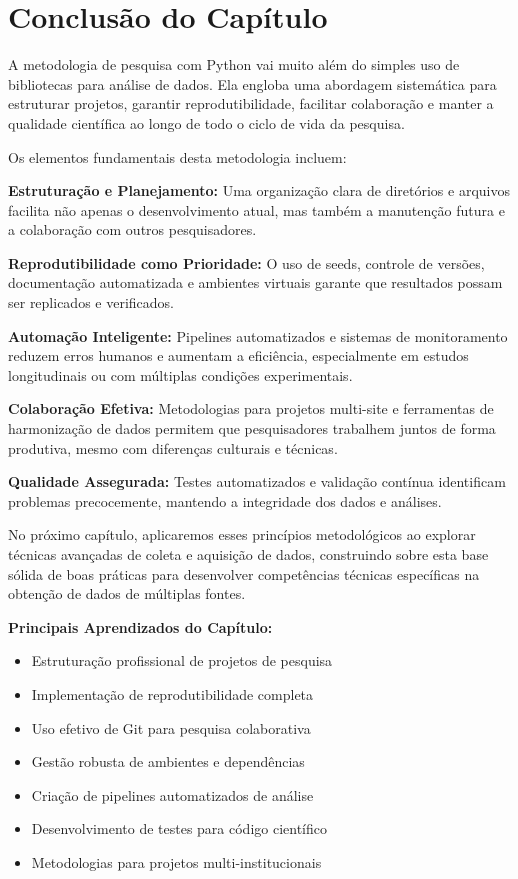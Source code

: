 \section{Conclusão do Capítulo}

A metodologia de pesquisa com Python vai muito além do simples uso de bibliotecas para análise de dados. Ela engloba uma abordagem sistemática para estruturar projetos, garantir reprodutibilidade, facilitar colaboração e manter a qualidade científica ao longo de todo o ciclo de vida da pesquisa.

Os elementos fundamentais desta metodologia incluem:

\textbf{Estruturação e Planejamento:} Uma organização clara de diretórios e arquivos facilita não apenas o desenvolvimento atual, mas também a manutenção futura e a colaboração com outros pesquisadores.

\textbf{Reprodutibilidade como Prioridade:} O uso de seeds, controle de versões, documentação automatizada e ambientes virtuais garante que resultados possam ser replicados e verificados.

\textbf{Automação Inteligente:} Pipelines automatizados e sistemas de monitoramento reduzem erros humanos e aumentam a eficiência, especialmente em estudos longitudinais ou com múltiplas condições experimentais.

\textbf{Colaboração Efetiva:} Metodologias para projetos multi-site e ferramentas de harmonização de dados permitem que pesquisadores trabalhem juntos de forma produtiva, mesmo com diferenças culturais e técnicas.

\textbf{Qualidade Assegurada:} Testes automatizados e validação contínua identificam problemas precocemente, mantendo a integridade dos dados e análises.

No próximo capítulo, aplicaremos esses princípios metodológicos ao explorar técnicas avançadas de coleta e aquisição de dados, construindo sobre esta base sólida de boas práticas para desenvolver competências técnicas específicas na obtenção de dados de múltiplas fontes.

\begin{examplebox}
\textbf{Principais Aprendizados do Capítulo:}
\begin{itemize}
    \item Estruturação profissional de projetos de pesquisa
    \item Implementação de reprodutibilidade completa
    \item Uso efetivo de Git para pesquisa colaborativa
    \item Gestão robusta de ambientes e dependências
    \item Criação de pipelines automatizados de análise
    \item Desenvolvimento de testes para código científico
    \item Metodologias para projetos multi-institucionais
\end{itemize}
\end{examplebox}

